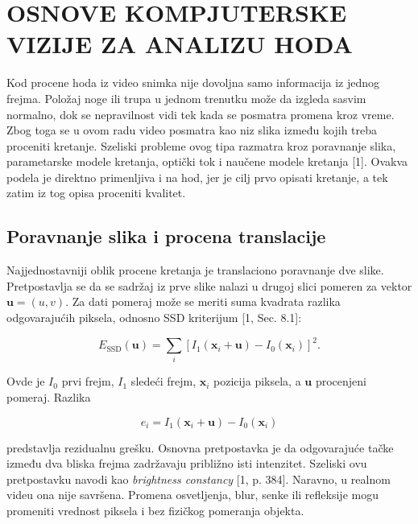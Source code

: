 %
%

\chapter{OSNOVE KOMPJUTERSKE VIZIJE ZA ANALIZU HODA}

Kod procene hoda iz video snimka nije dovoljna samo informacija iz jednog frejma. Položaj noge ili trupa u jednom trenutku može da izgleda sasvim normalno, dok se nepravilnost vidi tek kada se posmatra promena kroz vreme. Zbog toga se u ovom radu video posmatra kao niz slika između kojih treba proceniti kretanje. Szeliski probleme ovog tipa razmatra kroz poravnanje slika, parametarske modele kretanja, optički tok i naučene modele kretanja [1]. Ovakva podela je direktno primenljiva i na hod, jer je cilj prvo opisati kretanje, a tek zatim iz tog opisa proceniti kvalitet.

\section{Poravnanje slika i procena translacije}

Najjednostavniji oblik procene kretanja je translaciono poravnanje dve slike. Pretpostavlja se da se sadržaj iz prve slike nalazi u drugoj slici pomeren za vektor $\mathbf{u}=(u,v)$. Za dati pomeraj može se meriti suma kvadrata razlika odgovarajućih piksela, odnosno SSD kriterijum [1, Sec. 8.1]:

\begin{equation}
E_{\mathrm{SSD}}(\mathbf{u})=
\sum_i \left[I_1(\mathbf{x}_i+\mathbf{u})-I_0(\mathbf{x}_i)\right]^2.
\label{eq:ssd_alignment}
\end{equation}

Ovde je $I_0$ prvi frejm, $I_1$ sledeći frejm, $\mathbf{x}_i$ pozicija piksela, a $\mathbf{u}$ procenjeni pomeraj. Razlika

\begin{equation}
e_i=I_1(\mathbf{x}_i+\mathbf{u})-I_0(\mathbf{x}_i)
\end{equation}

predstavlja rezidualnu grešku. Osnovna pretpostavka je da odgovarajuće tačke između dva bliska frejma zadržavaju približno isti intenzitet. Szeliski ovu pretpostavku navodi kao \textit{brightness constancy} [1, p. 384]. Naravno, u realnom videu ona nije savršena. Promena osvetljenja, blur, senke ili refleksije mogu promeniti vrednost piksela i bez fizičkog pomeranja objekta.

